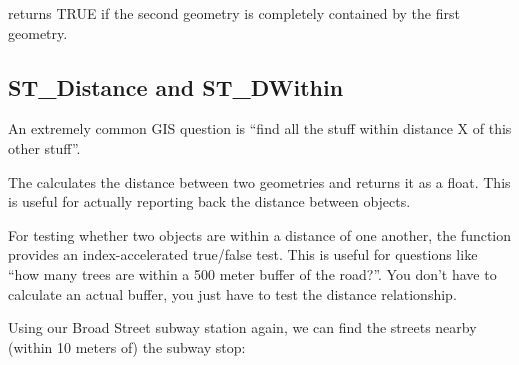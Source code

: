 \documentclass[a4paper,11pt,english]{sphinxmanual}
\begin{document}
 returns TRUE if the second geometry is completely contained by the first geometry.


\subsection{ST\_Distance and ST\_DWithin}
\label{\detokenize{basic:st-distance-and-st-dwithin}}
An extremely common GIS question is “find all the stuff within distance X of this other stuff”.

The  calculates the  distance between two geometries and returns it as a float. This is useful for actually reporting back the distance between objects.

\begin{sphinxVerbatim}[commandchars=\\\{\}]
 
\end{sphinxVerbatim}

\begin{sphinxVerbatim}[commandchars=\\\{\}]
\end{sphinxVerbatim}

For testing whether two objects are within a distance of one another, the  function provides an index-accelerated true/false test. This is useful for questions like “how many trees are within a 500 meter buffer of the road?”. You don’t have to calculate an actual buffer, you just have to test the distance relationship.

\begin{figure}[htbp]
\centering

\noindent{}
\end{figure}

Using our Broad Street subway station again, we can find the streets nearby (within 10 meters of) the subway stop:

\begin{sphinxVerbatim}[commandchars=\\\{\}]
 
 
 
\end{sphinxVerbatim}
\end{document}
